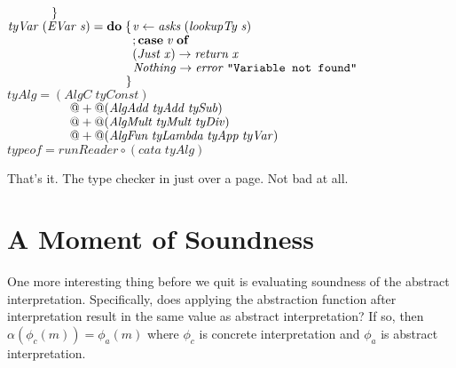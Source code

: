 \documentclass[10pt]{article}
\newcommand{\Conid}[1]{\mathit{#1}}
\newcommand{\Varid}[1]{\mathit{#1}}
\begin{document}
\begin{tabbing}
${\hskip2.00em\relax\phantom{\mathbf{do}\;\mbox{}}\mskip1.5mu\}}$\\
${}$\\
${\Varid{tyVar}\;(\Conid{EVar}\;\Varid{s})\mathrel{=}\mathbf{do}\;\{\mskip1.5mu \Varid{v}\leftarrow \Varid{asks}\;(\Varid{lookupTy}\;\Varid{s})}$\\
${\phantom{\Varid{tyVar}\;(\Conid{EVar}\;\Varid{s})\mathrel{=}\mathbf{do}\;\{\mskip1.5mu \mbox{}};\mathbf{case}\;\Varid{v}\;\mathbf{of}}$\\
${\phantom{\Varid{tyVar}\;(\Conid{EVar}\;\Varid{s})\mathrel{=}\mathbf{do}\;\{\mskip1.5mu \mbox{}}(\Conid{Just}\;\Varid{x})\to \Varid{return}\;\Varid{x}}$\\
${\phantom{\Varid{tyVar}\;(\Conid{EVar}\;\Varid{s})\mathrel{=}\mathbf{do}\;\{\mskip1.5mu \mbox{}}\Conid{Nothing}\to \Varid{error}\;\text{\tt \char34 Variable~not~found\char34}}$\\
${\phantom{\Varid{tyVar}\;(\Conid{EVar}\;\Varid{s})\mathrel{=}\mathbf{do}\;\mbox{}}\mskip1.5mu\}}$\\
${}$\\
${\Varid{tyAlg}\mathrel{=}(\Conid{AlgC}\;\Varid{tyConst})}$\\
${\hskip5.00em\relax\mathbin{@+@}(\Conid{AlgAdd}\;\Varid{tyAdd}\;\Varid{tySub})}$\\
${\hskip5.00em\relax\mathbin{@+@}(\Conid{AlgMult}\;\Varid{tyMult}\;\Varid{tyDiv})}$\\
${\hskip5.00em\relax\mathbin{@+@}(\Conid{AlgFun}\;\Varid{tyLambda}\;\Varid{tyApp}\;\Varid{tyVar})}$\\
${}$\\
${\Varid{typeof}\mathrel{=}\Varid{runReader}\mathbin{\circ}(\Varid{cata}\;\Varid{tyAlg})}$
\end{tabbing}
That's it.  The type checker in just over a page.  Not bad at all.

\section{A Moment of Soundness}

One more interesting thing before we quit is evaluating soundness of
the abstract interpretation.  Specifically, does applying the
abstraction function after interpretation result in the same value as
abstract interpretation?  If so, then $\alpha(\phi_c(m))=\phi_a(m)$
where $\phi_c$ is concrete interpretation and $\phi_a$ is abstract
interpretation.
\end{document}
